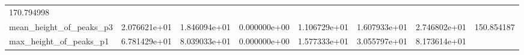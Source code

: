 \documentclass[11pt]{article}
\begin{document}
\begin{longtable}[]{@{}llllllll@{}}
\begin{minipage}[t]{0.08\columnwidth}
170.794998\strut
\end{minipage}\tabularnewline
\begin{minipage}[t]{0.16\columnwidth}\raggedright
mean\_height\_of\_peaks\_p3\strut
\end{minipage} & \begin{minipage}[t]{0.09\columnwidth}\raggedright
2.076621e+01\strut
\end{minipage} & \begin{minipage}[t]{0.09\columnwidth}\raggedright
1.846094e+01\strut
\end{minipage} & \begin{minipage}[t]{0.09\columnwidth}\raggedright
0.000000e+00\strut
\end{minipage} & \begin{minipage}[t]{0.09\columnwidth}\raggedright
1.106729e+01\strut
\end{minipage} & \begin{minipage}[t]{0.09\columnwidth}\raggedright
1.607933e+01\strut
\end{minipage} & \begin{minipage}[t]{0.09\columnwidth}\raggedright
2.746802e+01\strut
\end{minipage} & \begin{minipage}[t]{0.08\columnwidth}\raggedright
150.854187\strut
\end{minipage}\tabularnewline
\begin{minipage}[t]{0.16\columnwidth}\raggedright
max\_height\_of\_peaks\_p1\strut
\end{minipage} & \begin{minipage}[t]{0.09\columnwidth}\raggedright
6.781429e+01\strut
\end{minipage} & \begin{minipage}[t]{0.09\columnwidth}\raggedright
8.039033e+01\strut
\end{minipage} & \begin{minipage}[t]{0.09\columnwidth}\raggedright
0.000000e+00\strut
\end{minipage} & \begin{minipage}[t]{0.09\columnwidth}\raggedright
1.577333e+01\strut
\end{minipage} & \begin{minipage}[t]{0.09\columnwidth}\raggedright
3.055797e+01\strut
\end{minipage} & \begin{minipage}[t]{0.09\columnwidth}\raggedright
8.173614e+01\strut
\end{minipage} & \begin{minipage}[t]{0.08\columnwidth}\raggedright

\end{minipage}
\end{longtable}
\end{document}
